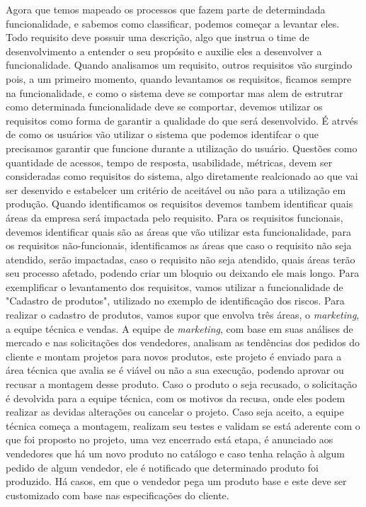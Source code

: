       Agora que temos mapeado os processos que fazem parte de determindada funcionalidade,
      e sabemos como classificar, podemos começar a levantar eles. Todo requisito
      deve possuir uma descrição, algo que instrua o time de desenvolvimento a entender
      o seu propósito e auxilie eles a desenvolver a funcionalidade. Quando analisamos
      um requisito, outros requisitos vão surgindo pois, a um primeiro momento,
      quando levantamos os requisitos, ficamos sempre na funcionalidade, e como o
      sistema deve se comportar mas alem de estrutrar como determinada funcionalidade
      deve se comportar, devemos utilizar os requisitos como forma de garantir a
      qualidade do que será desenvolvido. É atrvés de como os usuários vão utilizar
      o sistema que podemos identifcar o que precisamos garantir que funcione durante
      a utilização do usuário. Questões como quantidade de acessos, tempo de resposta,
      usabilidade, métricas, devem ser consideradas como requisitos do sistema, algo
      diretamente realcionado ao que vai ser desenvido e estabelcer um critério de
      aceitável ou não para a utilização em produção. Quando identificamos os requisitos
      devemos tambem identificar quais áreas da empresa será impactada pelo requisito.
      Para os requisitos funcionais, devemos identificar quais são as áreas que vão
      utilizar esta funcionalidade, para os requisitos não-funcionais, identificamos
      as áreas que caso o requisito não seja atendido, serão impactadas, caso o
      requisito não seja atendido, quais áreas terão seu processo afetado, podendo
      criar um bloquio ou deixando ele mais longo. Para exemplificar o levantamento
      dos requisitos, vamos utilizar a funcionalidade de "Cadastro de produtos",
      utilizado no exemplo de identificação dos riscos. \newline
      Para realizar o cadastro de produtos, vamos supor que envolva três áreas, o
      \textit{marketing}, a equipe técnica e vendas. A equipe de \textit{marketing},
      com base em suas análises de mercado e nas solicitações dos vendedores, analisam
      as tendências dos pedidos do cliente e montam projetos para novos produtos,
      este projeto é enviado para a área técnica que avalia se é viável ou não a
      sua execução, podendo aprovar ou recusar a montagem desse produto. Caso o
      produto o seja recusado, o solicitação é devolvida para a equipe técnica,
      com os motivos da recusa, onde eles podem realizar as devidas alterações ou
      cancelar o projeto. Caso seja aceito, a equipe técnica começa a montagem,
      realizam seu testes e validam se está aderente com o que foi proposto no
      projeto, uma vez encerrado está etapa, é anunciado aos vendedores que há um
      novo produto no catálogo e caso tenha relação à algum pedido de algum vendedor,
      ele é notificado que determinado produto foi produzido. Há casos, em que o
      vendedor pega um produto base e este deve ser customizado com base nas
      especificações do cliente. \newline

